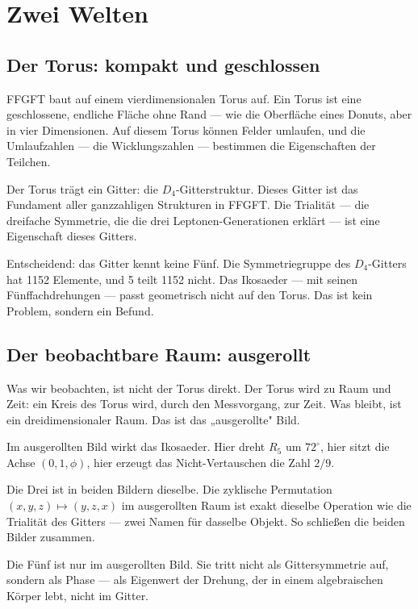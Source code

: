 \documentclass[12pt,oneside]{book}
\begin{document}
\chapter{Zwei Welten}

\section{Der Torus: kompakt und geschlossen}

FFGFT baut auf einem vier\-dimen\-sio\-nalen Torus auf. Ein Torus ist eine geschlossene, endliche Fläche ohne Rand — wie die Oberfläche eines Donuts, aber in vier Dimensionen. Auf diesem Torus können Felder umlaufen, und die Um\-lauf\-zahlen — die Wicklungszahlen — bestimmen die Eigenschaften der Teilchen.

Der Torus trägt ein Gitter: die $D_4$-Gitterstruktur. Dieses Gitter ist das Fundament aller ganzzahligen Strukturen in FFGFT. Die Trialität — die dreifache Symmetrie, die die drei Leptonen-Generationen erklärt — ist eine Eigenschaft dieses Gitters.

Entscheidend: das Gitter kennt keine Fünf. Die Symmetriegruppe des $D_4$-Gitters hat 1152 Elemente, und 5 teilt 1152 nicht. Das Ikosaeder — mit seinen Fünffachdrehungen — passt geometrisch nicht auf den Torus. Das ist kein Problem, sondern ein Befund.

\section{Der beobachtbare Raum: ausgerollt}

Was wir beobachten, ist nicht der Torus direkt. Der Torus wird zu Raum und Zeit: ein Kreis des Torus wird, durch den Messvorgang, zur Zeit. Was bleibt, ist ein dreidimensionaler Raum. Das ist das „ausgerollte" Bild.

Im ausgerollten Bild wirkt das Ikosaeder. Hier dreht $R_5$ um $72^\circ$, hier sitzt die Achse $(0, 1, \phi)$, hier erzeugt das Nicht-Vertauschen die Zahl $2/9$.

Die Drei ist in beiden Bildern dieselbe. Die zyklische Permutation $(x, y, z) \mapsto (y, z, x)$ im ausgerollten Raum ist exakt dieselbe Operation wie die Trialität des Gitters — zwei Namen für dasselbe Objekt. So schließen die beiden Bilder zusammen.

Die Fünf ist nur im ausgerollten Bild. Sie tritt nicht als Gittersymmetrie auf, sondern als Phase — als Eigenwert der Drehung, der in einem algebraischen Körper lebt, nicht im Gitter.
\end{document}
